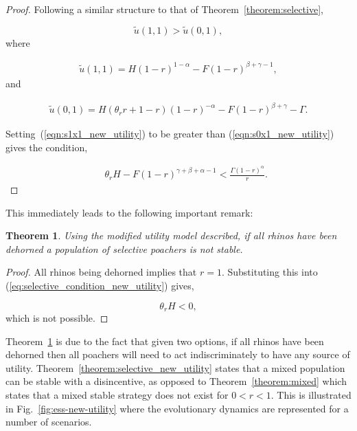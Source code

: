 \documentclass[10pt]{article}
\newtheorem{theorem}{Theorem}
\begin{document}
\begin{proof}
    Following a similar structure to that of Theorem~\ref{theorem:selective},

    \begin{equation}
    \tilde{u}(1,1) > \tilde{u}(0,1),
    \end{equation}
    where

    \begin{eqnarray}
    \label{eqn:s1x1_new_utility}
    \tilde{u}(1,1) = H(1 - r)^{1 - \alpha} - F(1 - r)^{\beta + \gamma - 1},
    \end{eqnarray}
    and

    \begin{eqnarray}
    \label{eqn:s0x1_new_utility}
    \tilde{u}(0,1) = H(\theta_r r +1 - r)(1 - r)^{-\alpha} - F(1 - r)^{\beta + \gamma} - \Gamma.
    \end{eqnarray}

    \noindent Setting~(\ref{eqn:s1x1_new_utility}) to be greater than (\ref{eqn:s0x1_new_utility})
    gives the condition,

    \begin{eqnarray}
    \label{eqn:s1x1_s0x1_new_utility}
    &&\theta_r H -  F(1 -r) ^{\gamma + \beta + \alpha -1} < \frac{\Gamma (1- r) ^ {\alpha}}{r}.
    \end{eqnarray}
\end{proof}

\noindent This immediately leads to the following important remark:

\begin{theorem}\label{theorem:devaluating_rhinos}
Using the modified utility model described,
if all rhinos have been dehorned a population of selective poachers is not
stable.
\end{theorem}

\begin{proof}
All rhinos being dehorned implies that \(r=1\). Substituting this into
(\ref{eq:selective_condition_new_utility}) gives,

\begin{equation}
    \theta_r H < 0,
\end{equation}
which is not possible.
\end{proof}

Theorem~\ref{theorem:devaluating_rhinos} is due to the fact that given two
options, if all rhinos have been dehorned then all poachers will need to act
indiscriminately to have any source of utility. Theorem~\ref{theorem:selective_new_utility}
states that a  mixed population can be stable with a disincentive, as opposed to
Theorem~\ref{theorem:mixed} which states that a mixed stable strategy does not
exist for \(0 <r <1\). This is illustrated in Fig.~\ref{fig:ess-new-utility} where
the evolutionary dynamics are represented for a number of scenarios.
\end{document}
